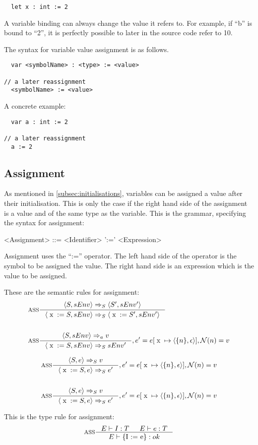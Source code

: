 \begin{verbatim}
  let x : int := 2
\end{verbatim}

A variable binding can always change the value it refers to. For example, if \enquote{b} is bound to \enquote{2}, it is perfectly possible to later in the source code refer to {10}.

The syntax for variable value assignment is as follows.

\begin{verbatim}
  var <symbolName> : <type> := <value>

// a later reassignment
  <symbolName> := <value>
\end{verbatim}
A concrete example:

\begin{verbatim}
  var a : int := 2
  
// a later reassignment
  a := 2
\end{verbatim}

\subsection{Assignment}\label{subsec:assignment}
As mentioned in \cref{subsec:initialisations}, variables can be assigned a value after their initialisation. This is only the case if the right hand side of the assignment is a value and of the same type as the variable.
This is the grammar, specifying the syntax for assignment:
\begin{grammar}
<Assignment> ::= <Identifier>  ':=' <Expression>
\end{grammar}
Assignment uses the \enquote{:=} operator. The left hand side of the operator is the symbol to be assigned the value. The right hand side is an expression which is the value to be assigned.

These are the semantic rules for assignment:
\begin{align*}
&\inference[ASS]{\Braket{S,sEnv} \Rightarrow_S \Braket{S',sEnv'}}
                 {\Braket{\Tx := S,sEnv} \Rightarrow_S \Braket{\Tx := S',sEnv'}}
\\\\
&\inference[ASS]{\Braket{S,sEnv} \Rightarrow_a v}
                 {\Braket{\Tx := S,sEnv} \Rightarrow_S sEnv'}
								 {, e' = e[\Tx \mapsto \Braket{\{n\},\epsilon}], \mathcal{N}(n) = v}
\end{align*}

\begin{align*}
&\inference[ASS]{\Braket{S,e} \Rightarrow_S v}
                 {\Braket{\Tx := S,e} \Rightarrow_S e'}
								 {, e' = e[\Tx \mapsto \Braket{\{n\},\epsilon}], \mathcal{N}(n) = v}
\\\\
&\inference[ASS]{\Braket{S,e} \Rightarrow_S v}
                 {\Braket{\Tx := S,e} \Rightarrow_S e'}
								 {, e' = e[\Tx \mapsto \Braket{\{n\},\epsilon}], \mathcal{N}(n) = v}
\end{align*}


This is the type rule for assignment:
\begin{align*}
&\inference[ASS]{\Tenv I : T & \Tenv e: T}
                 {\Tenv \text{\{I := e\}} : ok}
\\\\
\end{align*}
